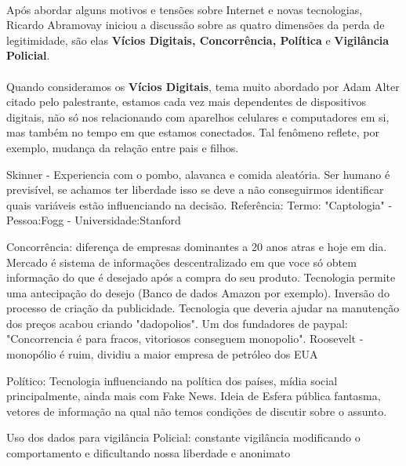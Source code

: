 \documentclass[12pt]{article}
\begin{document}
	\paragraph{}
		Após abordar alguns motivos e tensões sobre Internet e novas tecnologias,
		Ricardo Abramovay iniciou a discussão sobre as quatro dimensões da perda
		de legitimidade, são elas \textbf{Vícios Digitais, Concorrência, Política} e 
		\textbf{Vigilância Policial}.
	\paragraph{}	
		Quando consideramos os \textbf{Vícios Digitais}, tema muito abordado
		por Adam Alter citado pelo palestrante, estamos cada vez mais 
		dependentes de dispositivos digitais, não só nos relacionando com aparelhos 
		celulares e computadores em si, mas também no tempo em que estamos 
		conectados. Tal fenômeno reflete, por exemplo, mudança da relação 
		entre pais e filhos.
    
    
    Skinner - Experiencia com o pombo, alavanca e comida aleatória.
    Ser humano é previsível, se achamos ter liberdade isso se deve a não
    conseguirmos identificar quais variáveis estão influenciando
    na decisão.
    Referência: Termo: "Captologia" - Pessoa:Fogg - Universidade:Stanford

    Concorrência: diferença de empresas dominantes a 20 anos atras e hoje
    em dia. Mercado é sistema de informações descentralizado em que voce
    só obtem informação do que é desejado após a compra do seu produto.
    Tecnologia permite uma antecipação do desejo (Banco de dados Amazon por
    exemplo). Inversão do processo de criação da publicidade. Tecnologia que
    deveria ajudar na manutenção dos preços acabou criando "dadopolios".
    Um dos fundadores de paypal: "Concorrencia é para fracos, vitoriosos 
    conseguem monopolio".
    Roosevelt - monopólio é ruim, dividiu a maior empresa de petróleo dos EUA

    Político: Tecnologia influenciando na política dos países, mídia
    social principalmente, ainda mais com Fake News. Ideia de Esfera
    pública fantasma, vetores de informação na qual não temos condições
    de discutir sobre o assunto.

    Uso dos dados para vigilância Policial: constante vigilância modificando
    o comportamento e dificultando nossa liberdade e anonimato

     
\end{document}
